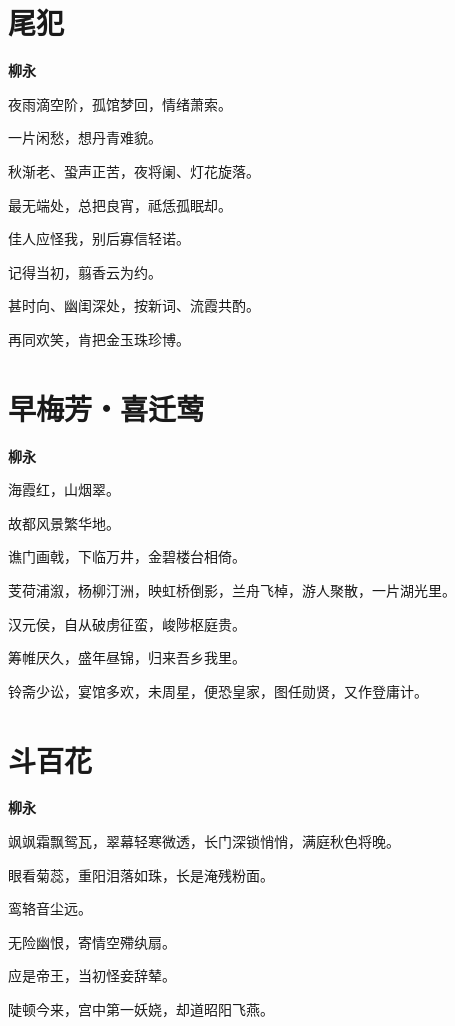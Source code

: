 \documentclass[12pt,a4paper]{ctexbook}
\begin{document}
\section{尾犯}
\textbf{柳永}\par\vspace{0.5em}
夜雨滴空阶，孤馆梦回，情绪萧索。\par
一片闲愁，想丹青难貌。\par
秋渐老、蛩声正苦，夜将阑、灯花旋落。\par
最无端处，总把良宵，祗恁孤眠却。\par
佳人应怪我，别后寡信轻诺。\par
记得当初，翦香云为约。\par
甚时向、幽闺深处，按新词、流霞共酌。\par
再同欢笑，肯把金玉珠珍博。\par

\section{早梅芳・喜迁莺}
\textbf{柳永}\par\vspace{0.5em}
海霞红，山烟翠。\par
故都风景繁华地。\par
谯门画戟，下临万井，金碧楼台相倚。\par
芰荷浦溆，杨柳汀洲，映虹桥倒影，兰舟飞棹，游人聚散，一片湖光里。\par
汉元侯，自从破虏征蛮，峻陟枢庭贵。\par
筹帷厌久，盛年昼锦，归来吾乡我里。\par
铃斋少讼，宴馆多欢，未周星，便恐皇家，图任勋贤，又作登庸计。\par

\section{斗百花}
\textbf{柳永}\par\vspace{0.5em}
飒飒霜飘鸳瓦，翠幕轻寒微透，长门深锁悄悄，满庭秋色将晚。\par
眼看菊蕊，重阳泪落如珠，长是淹残粉面。\par
鸾辂音尘远。\par
无险幽恨，寄情空殢纨扇。\par
应是帝王，当初怪妾辞辇。\par
陡顿今来，宫中第一妖娆，却道昭阳飞燕。\par
\end{document}
